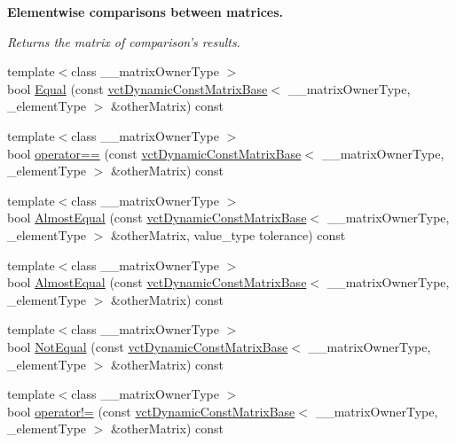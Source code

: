 \begin{Indent}{\bf Elementwise comparisons between matrices.}\par
{\em Returns the matrix of comparison's results. }\begin{DoxyCompactItemize}
\item 
{\footnotesize template$<$class \-\_\-\-\_\-matrix\-Owner\-Type $>$ }\\bool \hyperlink{classvct_dynamic_const_matrix_base_a62b4d925e04660013111852723b4e945}{Equal} (const \hyperlink{classvct_dynamic_const_matrix_base}{vct\-Dynamic\-Const\-Matrix\-Base}$<$ \-\_\-\-\_\-matrix\-Owner\-Type, \-\_\-element\-Type $>$ \&other\-Matrix) const 
\item 
{\footnotesize template$<$class \-\_\-\-\_\-matrix\-Owner\-Type $>$ }\\bool \hyperlink{classvct_dynamic_const_matrix_base_af6c4ce73e91bc3bb169e8883b7b1606a}{operator==} (const \hyperlink{classvct_dynamic_const_matrix_base}{vct\-Dynamic\-Const\-Matrix\-Base}$<$ \-\_\-\-\_\-matrix\-Owner\-Type, \-\_\-element\-Type $>$ \&other\-Matrix) const 
\item 
{\footnotesize template$<$class \-\_\-\-\_\-matrix\-Owner\-Type $>$ }\\bool \hyperlink{classvct_dynamic_const_matrix_base_a887b96b2d9c5f9b08ef92203e1195cd5}{Almost\-Equal} (const \hyperlink{classvct_dynamic_const_matrix_base}{vct\-Dynamic\-Const\-Matrix\-Base}$<$ \-\_\-\-\_\-matrix\-Owner\-Type, \-\_\-element\-Type $>$ \&other\-Matrix, value\-\_\-type tolerance) const 
\item 
{\footnotesize template$<$class \-\_\-\-\_\-matrix\-Owner\-Type $>$ }\\bool \hyperlink{classvct_dynamic_const_matrix_base_ad6a335d713fdc202e2cae3998944b580}{Almost\-Equal} (const \hyperlink{classvct_dynamic_const_matrix_base}{vct\-Dynamic\-Const\-Matrix\-Base}$<$ \-\_\-\-\_\-matrix\-Owner\-Type, \-\_\-element\-Type $>$ \&other\-Matrix) const 
\item 
{\footnotesize template$<$class \-\_\-\-\_\-matrix\-Owner\-Type $>$ }\\bool \hyperlink{classvct_dynamic_const_matrix_base_a44f8f00e7b7ff300180ee323f0ea035a}{Not\-Equal} (const \hyperlink{classvct_dynamic_const_matrix_base}{vct\-Dynamic\-Const\-Matrix\-Base}$<$ \-\_\-\-\_\-matrix\-Owner\-Type, \-\_\-element\-Type $>$ \&other\-Matrix) const 
\item 
{\footnotesize template$<$class \-\_\-\-\_\-matrix\-Owner\-Type $>$ }\\bool \hyperlink{classvct_dynamic_const_matrix_base_ab79413902e9274c1a252e41aa8431593}{operator!=} (const \hyperlink{classvct_dynamic_const_matrix_base}{vct\-Dynamic\-Const\-Matrix\-Base}$<$ \-\_\-\-\_\-matrix\-Owner\-Type, \-\_\-element\-Type $>$ \&other\-Matrix) const 

\end{DoxyCompactItemize}
\end{Indent}

